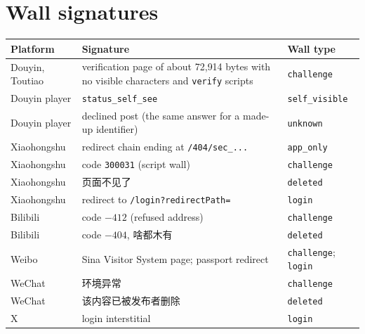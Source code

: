 \documentclass[11pt]{article}
\newcommand{\zh}[1]{#1}
\DeclareRobustCommand{\zh}[1]{\begin{CJK}{UTF8}{gbsn}#1\end{CJK}}
\newcommand{\wt}[1]{\texttt{#1}}%
\begin{document}
\section{Wall signatures}\label{app:walls}
\begin{center}\begin{minipage}{\textwidth}\centering\small
{}
\label{tab:signatures}
\begin{tabular}{@{}l p{8.4cm} l@{}}
\toprule
Platform & Signature & Wall type \\
\midrule
Douyin, Toutiao & verification page of about 72{,}914 bytes with no visible characters and \texttt{verify}
  scripts & \wt{challenge} \\
Douyin player & \texttt{status\_self\_see} & \wt{self\_visible} \\
Douyin player & declined post (the same answer for a made-up identifier) & \wt{unknown} \\
Xiaohongshu & redirect chain ending at \texttt{/404/sec\_...} & \wt{app\_only} \\
Xiaohongshu & code \texttt{300031} (script wall) & \wt{challenge} \\
Xiaohongshu & \zh{页面不见了} & \wt{deleted} \\
Xiaohongshu & redirect to \texttt{/login?redirectPath=} & \wt{login} \\
Bilibili & code $-412$ (refused address) & \wt{challenge} \\
Bilibili & code $-404$, \zh{啥都木有} & \wt{deleted} \\
Weibo & Sina Visitor System page; passport redirect & \wt{challenge}; \wt{login} \\
WeChat & \zh{环境异常} & \wt{challenge} \\
WeChat & \zh{该内容已被发布者删除} & \wt{deleted} \\
X & login interstitial & \wt{login} \\
\bottomrule
\end{tabular}
\end{minipage}\end{center}
\end{document}
